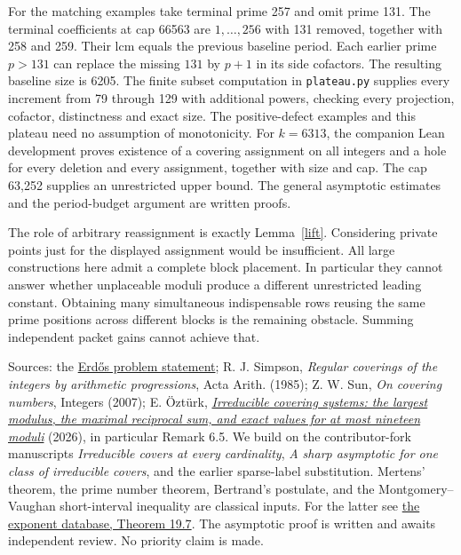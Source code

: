 \documentclass[11pt]{article}
\begin{document}
For the matching examples take terminal prime 257 and omit prime 131. The terminal coefficients at cap 66563 are $1,\ldots,256$ with 131 removed, together with 258 and 259. Their lcm equals the previous baseline period. Each earlier prime $p>131$ can replace the missing $131$ by $p+1$ in its side cofactors. The resulting baseline size is 6205. The finite subset computation in \texttt{plateau.py} supplies every increment from 79 through 129 with additional powers, checking every projection, cofactor, distinctness and exact size. The positive-defect examples and this plateau need no assumption of monotonicity. For $k=6313$, the companion Lean development proves existence of a covering assignment on all integers and a hole for every deletion and every assignment, together with size and cap. The cap 63,252 supplies an unrestricted upper bound. The general asymptotic estimates and the period-budget argument are written proofs.

The role of arbitrary reassignment is exactly Lemma~\ref{lift}. Considering private points just for the displayed assignment would be insufficient. All large constructions here admit a complete block placement. In particular they cannot answer whether unplaceable moduli produce a different unrestricted leading constant. Obtaining many simultaneous indispensable rows reusing the same prime positions across different blocks is the remaining obstacle. Summing independent packet gains cannot achieve that.

\smallskip\noindent
Sources: the \href{https://www.erdosproblems.com/1189}{Erd\H os problem statement}; R. J. Simpson, \emph{Regular coverings of the integers by arithmetic progressions}, Acta Arith. (1985); Z. W. Sun, \emph{On covering numbers}, Integers (2007); E. \"Ozt\"urk, \href{https://www.researchgate.net/publication/413884122}{\emph{Irreducible covering systems: the largest modulus, the maximal reciprocal sum, and exact values for at most nineteen moduli}} (2026), in particular Remark 6.5. We build on the contributor-fork manuscripts \emph{Irreducible covers at every cardinality}, \emph{A sharp asymptotic for one class of irreducible covers}, and the earlier sparse-label substitution. Mertens' theorem, the prime number theorem, Bertrand's postulate, and the Montgomery--Vaughan short-interval inequality are classical inputs. For the latter see \href{https://teorth.github.io/expdb/blueprint.pdf}{the exponent database, Theorem 19.7}. The asymptotic proof is written and awaits independent review. No priority claim is made.
\end{document}
